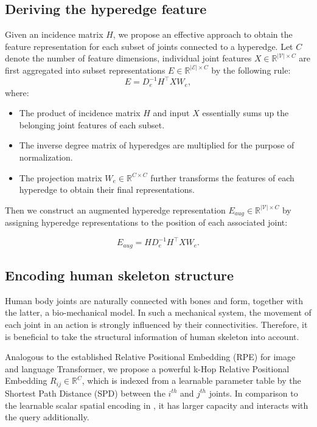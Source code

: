 \documentclass[10pt,twocolumn,letterpaper]{article}
\begin{document}
\subsection{Deriving the hyperedge feature}


Given an incidence matrix $H$, we propose an effective approach to obtain the feature representation for each subset of joints connected to a hyperedge. 
Let $C$ denote the number of feature dimensions, individual joint features $X \in \mathbb{R}^{\vert \mathcal{V} \vert \times C}$ are first aggregated into subset representations $E \in \mathbb{R}^{ \vert \mathcal{E} \vert \times C}$ by the following rule:
\begin{equation}
\label{eq:4}
     E = D_e^{-1}H^\top XW_{e},
\end{equation}
where:
\begin{itemize}
    \item The product of incidence matrix $H$ and input $X$ essentially sums up the belonging joint features of each subset. 
    \item The inverse degree matrix of hyperedges are multiplied for the purpose of normalization. 
    \item The projection matrix $W_{e} \in \mathbb{R}^{C\times C}$ further transforms the features of each hyperedge to obtain their final representations.
\end{itemize}




Then we construct an augmented hyperedge representation $E_{aug} \in \mathbb{R}^{ \vert \mathcal{V} \vert \times C}$ by assigning hyperedge representations to the position of each associated joint:


\begin{equation}
\label{eq:5}
    E_{aug} = HD_e^{-1}H^\top XW_{e}.
\end{equation}




\subsection{Encoding human skeleton structure}
Human body joints are naturally connected with bones and form, together with the latter, a bio-mechanical model. In such a mechanical system, the movement of each joint in an action is strongly influenced by their connectivities. Therefore, it is beneficial to take the structural information of human skeleton into account.

Analogous to the established Relative Positional Embedding (RPE) for image \cite{wu2021rethinking} and language \cite{he2020deberta, shaw2018self} Transformer, we propose a powerful k-Hop Relative Positional Embedding $R_{ij} \in \mathbb{R}^C$, which is indexed from a learnable parameter table by the Shortest Path Distance (SPD) between the $i^{th}$ and $j^{th}$ joints. 
In comparison to the learnable scalar spatial encoding in \cite{ying2021transformers}, it has larger capacity and interacts with the query additionally.
\end{document}
